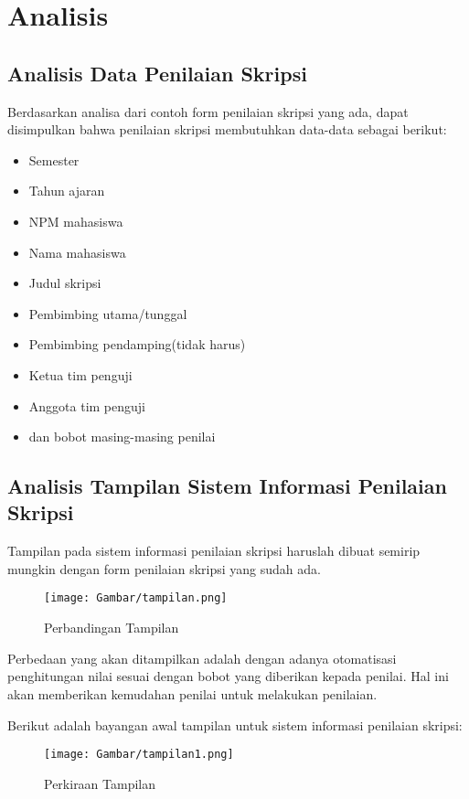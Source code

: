 \chapter{Analisis}
\label{chap: analisis}

\section{Analisis Data Penilaian Skripsi}
\label{sec: analisisData}

	Berdasarkan analisa dari contoh form penilaian skripsi yang ada, dapat disimpulkan bahwa penilaian skripsi membutuhkan data-data sebagai berikut:
		
		\begin{itemize}
			\item Semester
			\item Tahun ajaran
			\item NPM mahasiswa 
			\item Nama mahasiswa
			\item Judul skripsi
			\item Pembimbing utama/tunggal
			\item Pembimbing pendamping(tidak harus)
			\item Ketua tim penguji
			\item Anggota tim penguji
			\item dan bobot masing-masing penilai
		\end{itemize}
	
\section{Analisis Tampilan Sistem Informasi Penilaian Skripsi}
\label{sec: analisisTampilan}
	
	Tampilan pada sistem informasi penilaian skripsi haruslah dibuat semirip mungkin dengan form penilaian skripsi yang sudah ada.
		
	\begin{figure}[]
		\centering
		\texttt{[image: Gambar/tampilan.png]}
		\caption{Perbandingan Tampilan \cite{presentasi}}
		\label{fig:tampilan}
	\end{figure}
	
	Perbedaan yang akan ditampilkan adalah dengan adanya otomatisasi penghitungan nilai sesuai dengan bobot yang diberikan kepada penilai. Hal ini akan memberikan kemudahan penilai untuk melakukan penilaian.
	
	Berikut adalah bayangan awal tampilan untuk sistem informasi penilaian skripsi:
	\begin{figure}[]
		\centering
		\texttt{[image: Gambar/tampilan1.png]}
		\caption{Perkiraan Tampilan \cite{presentasi}}
		\label{fig:tampilan1}
	\end{figure}
	